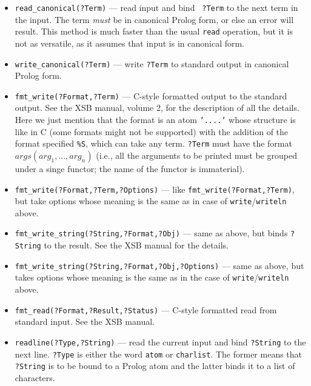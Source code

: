 \documentclass[11pt]{article}
\begin{document}
\begin{itemize}
  current input stream.
\item {\tt read\_canonical(?Term)} --- read input and bind {\tt
    ?Term} to the next term in the input. The term \emph{must} be in
  canonical Prolog form, or else an error will result. This method is much
  faster than the usual {\tt read} operation, but it is not as versatile,
  as it assumes that input is in canonical form.
\item {\tt write\_canonical(?Term)} --- write {\tt ?Term} to standard output
  in canonical Prolog form.
\item {\tt fmt\_write(?Format,?Term)} --- C-style formatted output to the
  standard output. See the XSB manual, volume 2, for the description of all
  the details. Here we just mention that the format is an atom
  \texttt{'....'} whose structure is like in C (some formats might not be
  supported) with the addition of the format specified \texttt{\%S}, which
  can take any term. \texttt{?Term} must have the format
  \texttt{$args(arg_1,...,arg_n)$} (i.e., all the arguments to be printed
  must be grouped under a singe functor; the name of the functor is
  immaterial).
\item {\tt fmt\_write(?Format,?Term,?Options)} --- like
  \texttt{fmt\_write(?Format,?Term)}, but take options whose meaning is the
  same as in case of \texttt{write}/\texttt{writeln} above.  
\item {\tt fmt\_write\_string(?String,?Format,?Obj)} --- same as above, but
  binds
  {\tt ?String} to the result. See the XSB manual for the details.
\item {\tt fmt\_write\_string(?String,?Format,?Obj,?Options)} --- same as
  above, but takes options whose meaning is the same as in the case of
  \texttt{write}/\texttt{writeln} above.
\item {\tt fmt\_read(?Format,?Result,?Status)} --- C-style formatted read from
  standard input. See the XSB manual.
\item {\tt readline(?Type,?String)} --- read the current input and bind
  {\tt ?String} to the next line. {\tt ?Type} is either the word
  {\tt atom} or
  {\tt charlist}. The former means that {\tt ?String} is to be bound to a
  Prolog atom and the latter binds it to a list of characters.
\end{itemize}
\end{document}

